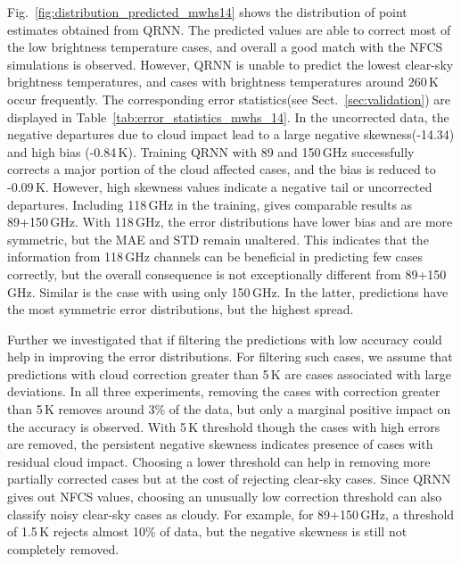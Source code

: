 \documentclass[amt, manuscript]{copernicus}
\begin{document}
Fig.~\ref{fig:distribution_predicted_mwhs14} shows the distribution of point estimates obtained from QRNN. The predicted values are able to correct most of the low brightness temperature cases, and overall a good match with the NFCS simulations is observed. However, QRNN is unable to predict the lowest clear-sky brightness temperatures, and cases with brightness temperatures around 260\,K occur frequently. The corresponding error statistics(see Sect.~\ref{sec:validation}) are displayed in  Table~\ref{tab:error_statistics_mwhs_14}. In the uncorrected data, the negative departures due to cloud impact lead to a large negative skewness(-14.34) and high bias (-0.84\,K). Training QRNN with 89 and 150\,GHz successfully corrects a major portion of the cloud affected cases, and the bias is reduced to -0.09\,K. However, high skewness values indicate a negative tail or uncorrected departures. Including 118\,GHz in the training, gives comparable results as 89+150\,GHz. With 118\,GHz, the error distributions have lower bias and are more symmetric, but the MAE and STD remain unaltered. This indicates that the information from 118\,GHz channels can be beneficial in predicting few cases correctly, but the overall consequence is not exceptionally different from 89+150\,GHz. Similar is the case with using only 150\,GHz. In the latter, predictions have the most symmetric  error distributions, but the highest spread. 

Further we investigated that if filtering the predictions with low accuracy could help in improving the error distributions. For filtering such cases, we assume that predictions with cloud correction greater than 5\,K are cases associated with large deviations. In all three experiments, removing the cases with correction greater than 5\,K removes around 3\% of the data, but only a marginal positive impact on the accuracy is observed. With 5\,K threshold though the cases with high errors are removed, the persistent negative skewness indicates presence of cases with residual cloud impact. Choosing a lower threshold can help in removing more partially corrected cases but at the cost of rejecting clear-sky cases. Since QRNN gives out NFCS values, choosing an unusually low correction threshold can also classify noisy clear-sky cases as cloudy. For example, for 89+150\,GHz, a threshold of 1.5\,K rejects almost 10\% of data, but the negative skewness is still not completely removed. 
\end{document}
